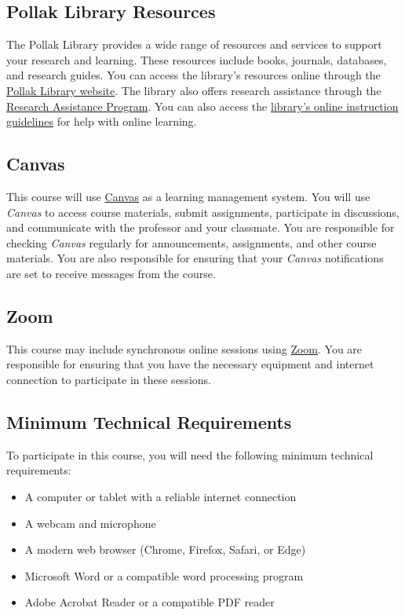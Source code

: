 \documentclass[11pt]{article}     %
\begin{document}
\subsection*{Pollak Library Resources}

The Pollak Library provides a wide range of resources and services to support your research and learning. These resources include books, journals, databases, and research guides. You can access the library's resources online through the \href{http://www.library.fullerton.edu/}{Pollak Library website}. The library also offers research assistance through the \href{http://www.library.fullerton.edu/research/}{Research Assistance Program}. You can also access the \href{http://www.library.fullerton.edu/about/guidelines/online-instruction-guidelines.php}{library's online instruction guidelines} for help with online learning.

\subsection*{Canvas}

This course will use \href{https://csufullerton.instructure.com/}{Canvas} as a learning management system. You will use \emph{Canvas} to access course materials, submit assignments, participate in discussions, and communicate with the professor and your classmate. You are responsible for checking \emph{Canvas} regularly for announcements, assignments, and other course materials. You are also responsible for ensuring that your \emph{Canvas} notifications are set to receive messages from the course.

\subsection*{Zoom}
This course may include synchronous online sessions using \href{https://fullerton.zoom.us/}{Zoom}. You are responsible for ensuring that you have the necessary equipment and internet connection to participate in these sessions.

\subsection*{Minimum Technical Requirements}

To participate in this course, you will need the following minimum technical requirements:
\begin{itemize}
    \item A computer or tablet with a reliable internet connection
    \item A webcam and microphone
    \item A modern web browser (Chrome, Firefox, Safari, or Edge)
    \item Microsoft Word or a compatible word processing program
    \item Adobe Acrobat Reader or a compatible PDF reader
\end{itemize}
\end{document}
